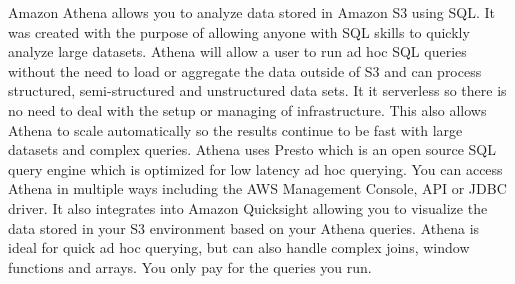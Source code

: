 Amazon Athena \cite{AthenaFAQ} allows you to analyze data stored in Amazon S3 using SQL. It was created with the purpose of allowing anyone with SQL skills to quickly analyze large datasets. Athena will allow a user to run ad hoc SQL queries without the need to load or aggregate the data outside of S3 and can process structured, semi-structured and unstructured data sets. It it serverless so there is no need to deal with the setup or managing of infrastructure. This also allows Athena to scale automatically so the results continue to be fast with large datasets and complex queries. Athena uses Presto which is an open source SQL query engine which is optimized for low latency ad hoc querying. You can access Athena in multiple ways including the AWS Management Console, API or JDBC driver. It also integrates into Amazon Quicksight allowing you to visualize the data stored in your S3 environment based on your Athena queries. Athena is ideal for quick ad hoc querying, but can also handle complex joins, window functions and arrays. You only pay for the queries you run.  \cite{AthenaFAQ}
